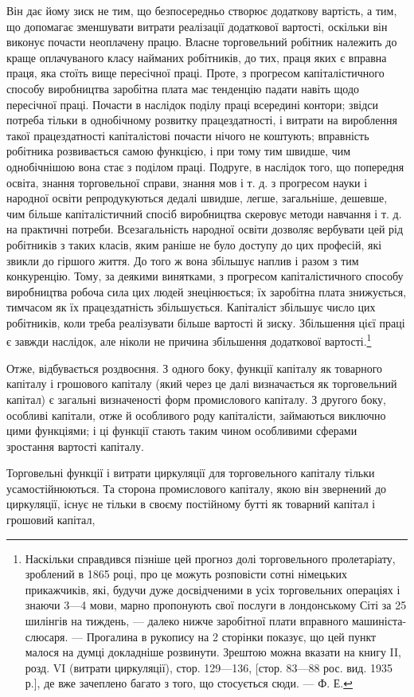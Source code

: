 Він дає йому зиск не тим, що безпосередньо створює додаткову
вартість, а тим, що допомагає зменшувати витрати реалізації додаткової
вартості, оскільки він виконує почасти неоплачену працю.
Власне торговельний робітник належить до краще оплачуваного
класу найманих робітників, до тих, праця яких є вправна праця,
яка стоїть вище пересічної праці. Проте, з прогресом капіталістичного
способу виробництва заробітна плата має тенденцію
падати навіть щодо пересічної праці. Почасти в наслідок поділу
праці всередині контори; звідси потреба тільки в однобічному
розвитку працездатності, і витрати на вироблення такої працездатності
капіталістові почасти нічого не коштують; вправність
робітника розвивається самою функцією, і при тому тим швидше,
чим однобічнішою вона стає з поділом праці. Подруге, в наслідок
того, що попередня освіта, знання торговельної справи,
знання мов і т. д. з прогресом науки і народної освіти репродукуються
дедалі швидше, легше, загальніше, дешевше, чим
більше капіталістичний спосіб виробництва скеровує методи
навчання і т. д. на практичні потреби. Всезагальність народної
освіти дозволяє вербувати цей рід робітників з таких класів,
яким раніше не було доступу до цих професій, які звикли до
гіршого життя. До того ж вона збільшує наплив і разом з тим
конкуренцію. Тому, за деякими винятками, з прогресом капіталістичного
способу виробництва робоча сила цих людей знецінюється;
їх заробітна плата знижується, тимчасом як їх
працездатність збільшується. Капіталіст збільшує число цих
робітників, коли треба реалізувати більше вартості й зиску.
Збільшення цієї праці є завжди наслідок, але ніколи не причина
збільшення додаткової вартості.\footnote{
Наскільки справдився пізніше цей прогноз долі торговельного пролетаріату,
зроблений в 1865 році, про це можуть розповісти сотні німецьких
прикажчиків, які, будучи дуже досвідченими в усіх торговельних операціях
і знаючи 3—4 мови, марно пропонують свої послуги в лондонському Сіті за
25 шилінгів на тиждень, — далеко нижче заробітної плати вправного машиніста-слюсаря. — Прогалина в
рукопису на 2 сторінки показує, що цей пункт
малося на думці докладніше розвинути. Зрештою можна вказати на книгу II,
розд. VI (витрати циркуляції), стор. 129—136, [стор. 83—88 рос. вид. 1935 р.],
де вже зачеплено багато з того, що стосується сюди. — Ф. Е.
}

Отже, відбувається роздвоєння. З одного боку, функції капіталу
як товарного капіталу і грошового капіталу (який через
це далі визначається як торговельний капітал) є загальні визначеності
форм промислового капіталу. З другого боку, особливі
капітали, отже й особливого роду капіталісти, займаються виключно
цими функціями; і ці функції стають таким чином особливими
сферами зростання вартості капіталу.

Торговельні функції і витрати циркуляції для торговельного
капіталу тільки усамостійнюються. Та сторона промислового капіталу,
якою він звернений до циркуляції, існує не тільки в своєму
постійному бутті як товарний капітал і грошовий капітал,